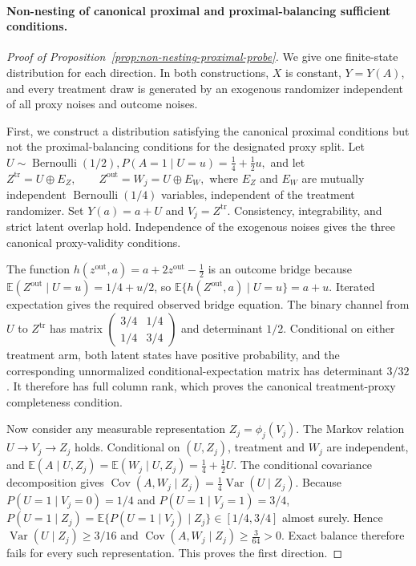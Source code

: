 \paragraph{Non-nesting of canonical proximal and proximal-balancing sufficient conditions.}
\begin{proof}[Proof of Proposition~\ref{prop:non-nesting-proximal-probe}]
We give one finite-state distribution for each direction. In both constructions, $X$ is constant, $Y=Y(A)$, and every treatment draw is generated by an exogenous randomizer independent of all proxy noises and outcome noises.

First, we construct a distribution satisfying the canonical proximal conditions but not the proximal-balancing conditions for the designated proxy split. Let
\(U\sim\operatorname{Bernoulli}(1/2), P(A=1\mid U=u)=\frac14+\frac12u,\)
and let
\(Z^{\mathrm{tr}}=U\mathbin\oplus E_Z, \qquad Z^{\mathrm{out}}=W_j=U\mathbin\oplus E_W,\)
where $E_Z$ and $E_W$ are mutually independent $\operatorname{Bernoulli}(1/4)$ variables, independent of the treatment randomizer. Set $Y(a)=a+U$ and $V_j=Z^{\mathrm{tr}}$. Consistency, integrability, and strict latent overlap hold. Independence of the exogenous noises gives the three canonical proxy-validity conditions.

The function
\(h(z^{\mathrm{out}},a)=a+2z^{\mathrm{out}}-\frac12\)
is an outcome bridge because $\mathbb E(Z^{\mathrm{out}}\mid U=u)=1/4+u/2$, so $\mathbb E\{h(Z^{\mathrm{out}},a)\mid U=u\}=a+u$. Iterated expectation gives the required observed bridge equation. The binary channel from $U$ to $Z^{\mathrm{tr}}$ has matrix
\(\begin{pmatrix} 3/4&1/4\\ 1/4&3/4 \end{pmatrix}\)
and determinant $1/2$. Conditional on either treatment arm, both latent states have positive probability, and the corresponding unnormalized conditional-expectation matrix has determinant $3/32$. It therefore has full column rank, which proves the canonical treatment-proxy completeness condition.

Now consider any measurable representation $Z_j=\phi_j(V_j)$. The Markov relation $U\to V_j\to Z_j$ holds. Conditional on $(U,Z_j)$, treatment and $W_j$ are independent, and
\(\mathbb E(A\mid U,Z_j) = \mathbb E(W_j\mid U,Z_j) = \frac14+\frac12U.\)
The conditional covariance decomposition gives
\(\operatorname{Cov}(A,W_j\mid Z_j) = \frac14\operatorname{Var}(U\mid Z_j).\)
Because $P(U=1\mid V_j=0)=1/4$ and $P(U=1\mid V_j=1)=3/4$,
\(P(U=1\mid Z_j) = \mathbb E\{P(U=1\mid V_j)\mid Z_j\} \in[1/4,3/4]\)
almost surely. Hence $\operatorname{Var}(U\mid Z_j)\ge3/16$ and
\(\operatorname{Cov}(A,W_j\mid Z_j)\ge\frac{3}{64}>0.\)
Exact balance therefore fails for every such representation. This proves the first direction.


\end{proof}
